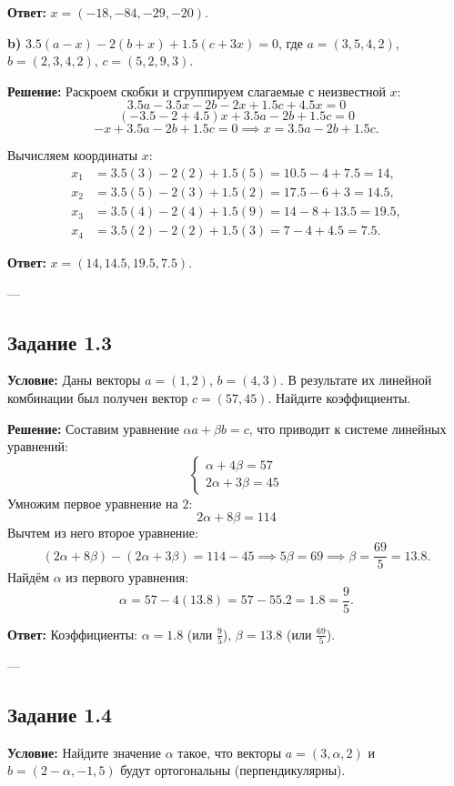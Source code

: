 \documentclass[11pt, a4paper]{article}
\begin{document}
\textbf{Ответ:} $x = (-18, -84, -29, -20)$.

\medskip
\textbf{b)} $3.5(a - x) - 2(b + x) + 1.5(c + 3x) = 0$, где $a = (3, 5, 4, 2)$, $b = (2, 3, 4, 2)$, $c = (5, 2, 9, 3)$.

\textbf{Решение:}
Раскроем скобки и сгруппируем слагаемые с неизвестной $x$:
$$ 3.5a - 3.5x - 2b - 2x + 1.5c + 4.5x = 0 $$
$$ (-3.5 - 2 + 4.5)x + 3.5a - 2b + 1.5c = 0 $$
$$ -x + 3.5a - 2b + 1.5c = 0 \implies x = 3.5a - 2b + 1.5c. $$

Вычисляем координаты $x$:
\begin{align*}
x_1 &= 3.5(3) - 2(2) + 1.5(5) = 10.5 - 4 + 7.5 = 14, \\
x_2 &= 3.5(5) - 2(3) + 1.5(2) = 17.5 - 6 + 3 = 14.5, \\
x_3 &= 3.5(4) - 2(4) + 1.5(9) = 14 - 8 + 13.5 = 19.5, \\
x_4 &= 3.5(2) - 2(2) + 1.5(3) = 7 - 4 + 4.5 = 7.5.
\end{align*}

\textbf{Ответ:} $x = (14, 14.5, 19.5, 7.5)$.

---

\subsection*{Задание 1.3}
\textbf{Условие:} Даны векторы $a=(1,2)$, $b=(4,3)$. В результате их линейной комбинации был получен вектор $c=(57,45)$. Найдите коэффициенты.

\textbf{Решение:}
Составим уравнение $\alpha a + \beta b = c$, что приводит к системе линейных уравнений:
$$ \begin{cases} \alpha + 4\beta = 57 \\ 2\alpha + 3\beta = 45 \end{cases} $$
Умножим первое уравнение на $2$:
$$ 2\alpha + 8\beta = 114 $$
Вычтем из него второе уравнение:
$$ (2\alpha + 8\beta) - (2\alpha + 3\beta) = 114 - 45 \implies 5\beta = 69 \implies \beta = \frac{69}{5} = 13.8. $$
Найдём $\alpha$ из первого уравнения:
$$ \alpha = 57 - 4(13.8) = 57 - 55.2 = 1.8 = \frac{9}{5}. $$

\textbf{Ответ:} Коэффициенты: $\alpha = 1.8$ (или $\frac{9}{5}$), $\beta = 13.8$ (или $\frac{69}{5}$).

---

\subsection*{Задание 1.4}
\textbf{Условие:} Найдите значение $\alpha$ такое, что векторы $a=(3,\alpha,2)$ и $b=(2-\alpha,-1,5)$ будут ортогональны (перпендикулярны).
\end{document}
